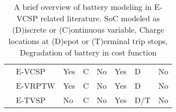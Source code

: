 \documentclass[]{article}
\begin{document}
\begin{landscape}
\begin{table}[h]
\begin{tabular}{llllllll}
    \citet{Cong2024}             & E-VCSP  & Yes & C   & No            & Yes         & D            & No          \\
    \addlinespace[0.4em]
    \citet{Ham2021}              & E-VRPTW & Yes & C   & No            & Yes         & D            & No          \\
    \citet{Stadnichuk2024}       & E-TVSP  & No  & C   & No            & Yes         & D/T          & No          \\
    \bottomrule
  \end{tabular}
  \caption{A brief overview of battery modeling in E-VCSP related literature. SoC modeled as (D)iscrete or (C)ontinuous variable, Charge locations at (D)epot or (T)erminal trip stops, Degradation of battery in cost function}
  \label{tab:eVCSP-lit}
\end{table}
\vfill
\end{landscape}
\end{document}

